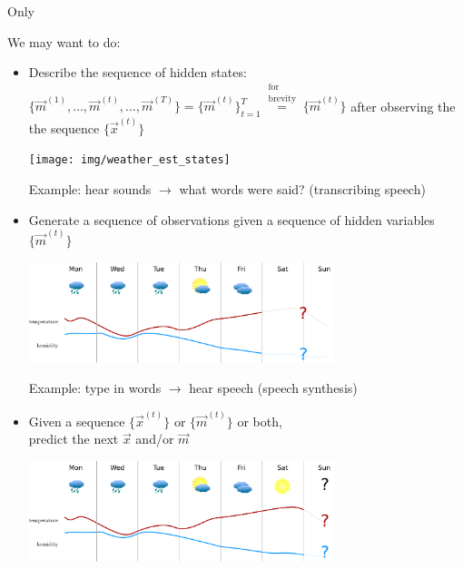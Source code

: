 \begin{frame}{Only}

We may want to do:
\begin{itemize}
\item<only@1> Describe the sequence of hidden states:
$\{ \vec m^{(1)}, \ldots, \vec m^{(t)}, \ldots, \vec m^{(T)}\} = \{ \vec m^{(t)}\}_{t=1}^{T} \stackrel{\substack{\text{for}\\ \text{brevity}}}{=} \{ \vec m^{(t)}\}$
after observing the the sequence $\{\vec x^{(t)}\}$\\

\svspace{5mm}

\begin{center}
	\texttt{[image: img/weather\_est\_states]}
\end{center}

Example: hear sounds $\rightarrow$ what words were said? (transcribing speech)
\item<only@2> Generate a sequence of observations given a sequence of hidden variables $\{\vec m^{(t)}\}$
\\

\svspace{5mm}

\begin{center}
	\includegraphics[width=0.7\textwidth]{img/weather_est_obs}
\end{center}

Example: type in words $\rightarrow$ hear speech (speech synthesis)
\item<only@3> Given a sequence $\{\vec x^{(t)}\}$ or $\{\vec m^{(t)}\}$ or both,\\
predict the next $\vec x$ and/or $\vec m$

\svspace{5mm}

\begin{center}
	\includegraphics[width=0.7\textwidth]{img/weather_est_next}
\end{center}

\end{itemize}


\end{frame}
